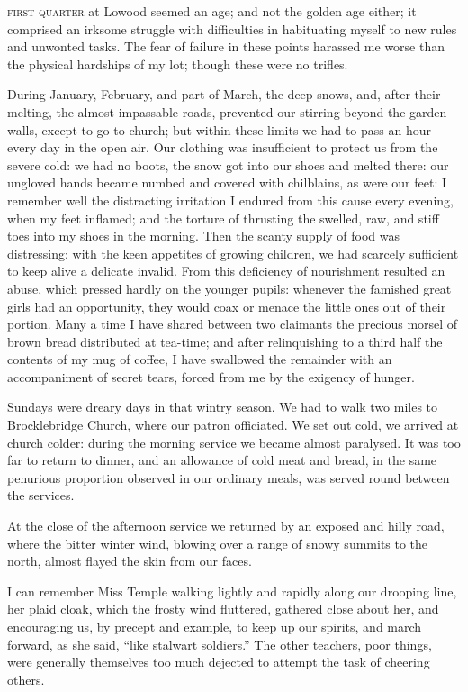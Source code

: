 
 \textsc{first quarter} at Lowood seemed an age; and not the golden age either;
it comprised an irksome struggle with difficulties in habituating myself
to new rules and unwonted tasks. The fear of failure in these points
harassed me worse than the physical hardships of my lot; though these
were no trifles.

During January, February, and part of March, the deep snows, and, after
their melting, the almost impassable roads, prevented our stirring
beyond the garden walls, except to go to church; but within these limits
we had to pass an hour every day in the open air. Our clothing was
insufficient to protect us from the severe cold: we had no boots, the
snow got into our shoes and melted there: our ungloved hands became
numbed and covered with chilblains, as were our feet: I remember well
the distracting irritation I endured from this cause every evening, when
my feet inflamed; and the torture of thrusting the swelled, raw, and
stiff toes into my shoes in the morning. Then the scanty supply of food
was distressing: with the keen appetites of growing children, we had
scarcely sufficient to keep alive a delicate invalid. From this
deficiency of nourishment resulted an abuse, which pressed hardly on the
younger pupils: whenever the famished great girls had an opportunity,
they would coax or menace the little ones out of their portion. Many a
time I have shared between two claimants the precious morsel of brown
bread distributed at tea-time; and after relinquishing to a third half
the contents of my mug of coffee, I have swallowed the remainder with an
accompaniment of secret tears, forced from me by the exigency of hunger.

Sundays were dreary days in that wintry season. We had to walk two
miles to Brocklebridge Church, where our patron officiated. We set out
cold, we arrived at church colder: during the morning service we became
almost paralysed. It was too far to return to dinner, and an allowance
of cold meat and bread, in the same penurious proportion observed in our
ordinary meals, was served round between the services.

At the close of the afternoon service we returned by an exposed and
hilly road, where the bitter winter wind, blowing over a range of snowy
summits to the north, almost flayed the skin from our faces.

I can remember Miss Temple walking lightly and rapidly along our
drooping line, her plaid cloak, which the frosty wind fluttered,
gathered close about her, and encouraging us, by precept and example, to
keep up our spirits, and march forward, as she said, \enquote{like
stalwart soldiers.} The other teachers, poor things, were generally
themselves too much dejected to attempt the task of cheering others.

